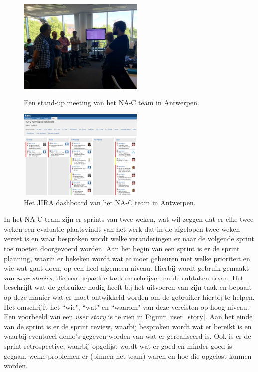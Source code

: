 \documentclass[10pt,a4paper]{article}
\begin{document}
\begin{figure}
\centering
\begin{minipage}{0.45\textwidth}
\centering
\includegraphics[width=60mm]{standupmeeting.jpg}
\caption{Een stand-up meeting van het NA-C team in Antwerpen.}
\label{standup}
\end{minipage}\hfill
\begin{minipage}{0.45\textwidth}
\centering
\includegraphics[width=60mm]{CaptureJira.png}
\caption{Het JIRA dashboard van het NA-C team in Antwerpen.}
\label{jira}
\end{minipage}
\end{figure}


In het NA-C team zijn er sprints van twee weken, wat wil zeggen dat er elke twee weken een evaluatie plaatsvindt van het werk dat in de afgelopen twee weken verzet is en waar besproken wordt welke veranderingen er naar de volgende sprint toe moeten doorgevoerd worden. Aan het begin van een sprint is er de sprint planning, waarin er bekeken wordt wat er moet gebeuren met welke prioriteit en wie wat gaat doen, op een heel algemeen niveau. Hierbij wordt gebruik gemaakt van \textit{user stories}, die een bepaalde taak omschrijven en de subtaken ervan. Het beschrijft wat de gebruiker nodig heeft bij het uitvoeren van zijn taak en bepaalt op deze manier wat er moet ontwikkeld worden om de gebruiker hierbij te helpen. Het omschrijft het ``wie", ``wat" en ``waarom" van deze vereisten op hoog niveau. Een voorbeeld van een \textit{user story} is te zien in Figuur \ref{user_story}. Aan het einde van de sprint is er de sprint review, waarbij besproken wordt wat er bereikt is en waarbij eventueel demo's gegeven worden van wat er gerealiseerd is. Ook is er de sprint retrospective, waarbij opgelijst wordt wat er goed en minder goed is gegaan, welke problemen er (binnen het team) waren en hoe die opgelost kunnen worden.
\end{document}
